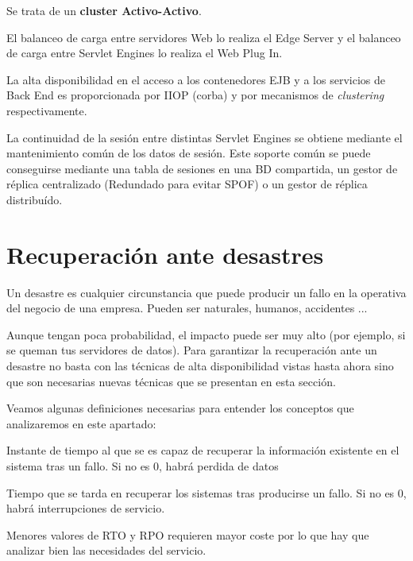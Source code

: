 \begin{enumerate}
\begin{example}
Se trata de un \textbf{cluster Activo-Activo}.

El balanceo de carga entre servidores Web lo realiza el Edge Server y el balanceo de carga entre Servlet Engines lo realiza el Web Plug In.

La alta disponibilidad en el acceso a los contenedores EJB y a los servicios de Back End es proporcionada por IIOP (corba) y por mecanismos de \textit{clustering} respectivamente.

La continuidad de la sesión entre distintas Servlet Engines se obtiene mediante el mantenimiento común de los datos de sesión. Este soporte común se puede conseguirse mediante una tabla de sesiones en una BD compartida, un gestor de réplica centralizado (Redundado para evitar SPOF) o un gestor de réplica distribuído.
\end{example}

\end{enumerate}

\section{Recuperación ante desastres}

Un desastre es cualquier circunstancia que puede producir un fallo en la operativa del negocio de una empresa. Pueden ser naturales, humanos, accidentes ...

Aunque tengan poca probabilidad, el impacto puede ser muy alto (por ejemplo, si se queman tus servidores de datos). Para garantizar la recuperación ante un desastre no basta con las técnicas de alta disponibilidad vistas hasta ahora sino que son necesarias nuevas técnicas que se presentan en esta sección.

Veamos algunas definiciones necesarias para entender los conceptos que analizaremos en este apartado:

\begin{defn}
Instante de tiempo al que se es capaz de recuperar la información existente en el sistema tras un fallo. Si no es 0, habrá perdida de datos
\end{defn}

\begin{defn}
Tiempo que se tarda en recuperar los sistemas tras producirse un fallo. Si no es 0, habrá interrupciones de servicio.
\end{defn}

Menores valores de RTO y RPO requieren mayor coste por lo que hay que analizar bien las necesidades del servicio.

